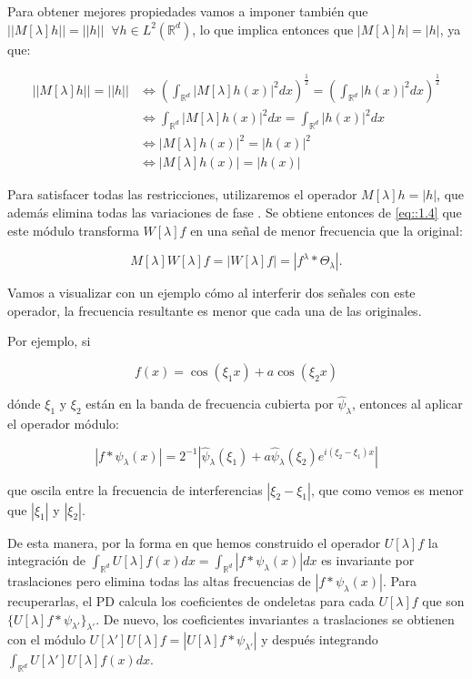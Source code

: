 \medskip

\noindent Para obtener mejores propiedades vamos a imponer también que $||M[\lambda]h||=||h|| \; \; \forall h \in L^2(\mathbb{R}^d)$, lo que implica entonces que $|M[\lambda]h|=|h|$, ya que:  

\begin{align*}
  ||M[\lambda]h||=||h|| &\iff \left(\int_{\mathbb{R}^d} |M[\lambda]h (x)|^2 dx \right)^{\frac{1}{2}} =\left(\int_{\mathbb{R}^d} |h(x)|^2 dx \right)^{\frac{1}{2}} \\
  & \iff \int_{\mathbb{R}^d} |M[\lambda]h (x)|^2 dx=\int_{\mathbb{R}^d} |h(x)|^2 dx \\
  & \iff |M[\lambda]h (x)|^2=|h(x)|^2 \\
  & \iff |M[\lambda]h (x)|=|h(x)|
\end{align*}

\medskip

\noindent Para satisfacer todas las restricciones, utilizaremos el operador $M[\lambda]h=|h|$, que además elimina todas las variaciones de fase \cite{bruna2013invariant}. Se obtiene entonces de \eqref{eq::1.4} que este módulo transforma $W[\lambda]f$ en una señal de menor frecuencia que la original:

$$M[\lambda]W[\lambda]f=|W[\lambda]f|=|f^\lambda \ast \Theta_\lambda|.$$

\noindent Vamos a visualizar con un ejemplo cómo al interferir dos señales con este operador, la frecuencia resultante es menor que cada una de las originales. 

\medskip

\noindent Por ejemplo, si 

$$f(x)=\cos(\xi_1 x)+a\cos(\xi_2 x)$$

\noindent dónde $\xi_1$ y $\xi_2$ están en la banda de frecuencia cubierta por $\widehat{\psi}_\lambda$, entonces al aplicar el operador módulo: 

$$|f \ast \psi_\lambda (x) |=2^{-1} |\widehat{\psi}_\lambda(\xi_1)+a\widehat{\psi}_\lambda(\xi_2)e^{i(\xi_2-\xi_1)x}|$$

\noindent que oscila entre la frecuencia de interferencias $|\xi_2-\xi_1|$, que como vemos es menor que $|\xi_1|$ y $|\xi_2|$.

\medskip

\noindent De esta manera, por la forma en que hemos construido el operador $U[\lambda] f$ la integración de $\int_{\mathbb{R}^d}U[\lambda]f(x) dx= \int_{\mathbb{R}^d} | f \ast \psi_\lambda(x)|dx$ es invariante por traslaciones pero elimina todas las altas frecuencias de $|f \ast \psi_\lambda(x)|$. Para recuperarlas, el PD calcula los coeficientes de ondeletas para cada $U[\lambda]f$ que son $\lbrace U[\lambda]f \ast \psi_{\lambda'}\rbrace_{\lambda'}$. De nuevo, los coeficientes invariantes a traslaciones se obtienen con el módulo $U[\lambda']U[\lambda]f=|U[\lambda]f \ast \psi_{\lambda'}|$ y después integrando $\int_{\mathbb{R}^d} U[\lambda']U[\lambda]f(x) dx$. 

